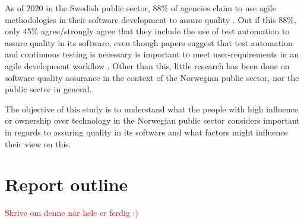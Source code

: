 As of 2020 in the Swedish public sector, 88\% of agencies claim to use agile methodologies in their software development to assure quality \cite{mb_2020}. Out if this 88\%, only 45\% agree/strongly agree that they include the use of test automation to assure quality in its software, even though papers suggest that test automation and continuous testing is necessary is important to meet user-requirements in an agile development workflow \cite{vk_2010}. Other than this, little research has been done on software quality assurance in the context of the Norwegian public sector, nor the public sector in general. 




The objective of this study is to understand what the people with high influence or ownership over technology in the Norwegian public sector considers important in regards to assuring quality in its software and what factors might influence their view on this.
 

\section{Report outline}

\textcolor{red}{Skrive om denne når hele er ferdig :)}
